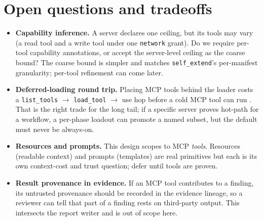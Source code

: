 \documentclass[11pt]{article}
\begin{document}
\section{Open questions and tradeoffs}

\begin{itemize}[leftmargin=*]
  \item \textbf{Capability inference.} A server declares one ceiling, but its
  tools may vary (a read tool and a write tool under one \texttt{network} grant).
  Do we require per-tool capability annotations, or accept the server-level
  ceiling as the coarse bound? The coarse bound is simpler and matches
  \texttt{self\_extend}'s per-manifest granularity; per-tool refinement can come
  later.
  \item \textbf{Deferred-loading round trip.} Placing MCP tools behind the loader
  costs a \texttt{list\_tools} $\rightarrow$ \texttt{load\_tool} $\rightarrow$
  use hop before a cold MCP tool can run \cite{tool-curation}.
  That is the right trade for the long tail; if a specific server proves
  hot-path for a workflow, a per-phase loadout can promote a named subset, but
  the default must never be always-on.
  \item \textbf{Resources and prompts.} This design scopes to MCP \emph{tools}.
  Resources (readable context) and prompts (templates) are real primitives
  \cite{mcp-arch} but each is its own context-cost and trust question; defer
  until tools are proven.
  \item \textbf{Result provenance in evidence.} If an MCP tool contributes to a
  finding, its untrusted provenance should be recorded in the evidence lineage,
  so a reviewer can tell that part of a finding rests on third-party output. This
  intersects the report writer and is out of scope here.
\end{itemize}
\end{document}
